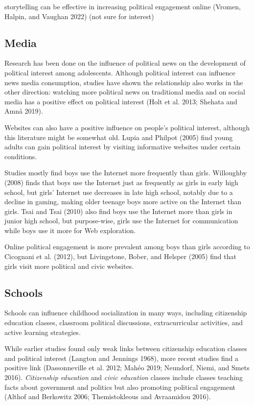 \documentclass[
  letterpaper,
  DIV=11,
  numbers=noendperiod]{scrreprt}
\begin{document}
storytelling can be effective in increasing political engagement online
(Vromen, Halpin, and Vaughan 2022) (not sure for interest)

\hypertarget{media}{%
\subsection{Media}\label{media}}

Research has been done on the influence of political news on the
development of political interest among adolescents. Although political
interest can influence news media consumption, studies have shown the
relationship also works in the other direction: watching more political
news on traditional media and on social media has a positive effect on
political interest (Holt et al. 2013; Shehata and Amnå 2019).

Websites can also have a positive influence on people's political
interest, although this literature might be somewhat old. Lupia and
Philpot (2005) find young adults can gain political interest by visiting
informative websites under certain conditions.

Studies mostly find boys use the Internet more frequently than girls.
Willoughby (2008) finds that boys use the Internet just as frequently as
girls in early high school, but girls' Internet use decreases in late
high school, notably due to a decline in gaming, making older teenage
boys more active on the Internet than girls. Tsai and Tsai (2010) also
find boys use the Internet more than girls in junior high school, but
purpose-wise, girls use the Internet for communication while boys use it
more for Web exploration.

Online political engagement is more prevalent among boys than girls
according to Cicognani et al. (2012), but Livingstone, Bober, and
Helsper (2005) find that girls visit more political and civic websites.

\hypertarget{schools}{%
\subsection{Schools}\label{schools}}

Schools can influence childhood socialization in many ways, including
citizenship education classes, classroom political discussions,
extracurricular activities, and active learning strategies.

While earlier studies found only weak links between citizenship
education classes and political interest (Langton and Jennings 1968),
more recent studies find a positive link (Dassonneville et al. 2012;
Mahéo 2019; Neundorf, Niemi, and Smets 2016). \emph{Citizenship
education} and \emph{civic education} classes include classes teaching
facts about government and politics but also promoting political
engagement (Althof and Berkowitz 2006; Themistokleous and Avraamidou
2016).
\end{document}
